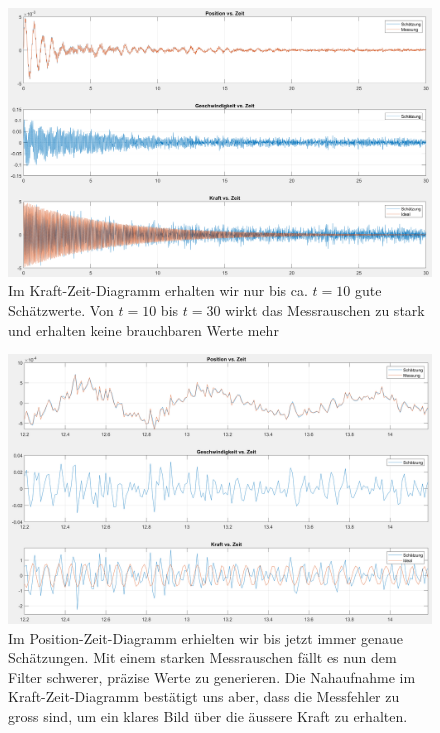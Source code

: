 \begin{figure}
	\begin{center}
		\includegraphics[width=\linewidth,keepaspectratio]{papers/erdbeben/Messrauschen_geaendert.PNG}
		\caption{Im Kraft-Zeit-Diagramm erhalten wir nur bis ca. $t = 10$ gute Schätzwerte. Von $t = 10$ bis $t = 30$ wirkt das Messrauschen zu stark und erhalten keine brauchbaren Werte mehr}
	 \label{erdbeben:fig:messrauschen-geaendert}
	\end{center}
\end{figure}

\begin{figure}
	\begin{center}
		\includegraphics[width=\linewidth,keepaspectratio]{papers/erdbeben/Messrauschen_geaendert_zoom.PNG}
		\caption{Im Position-Zeit-Diagramm erhielten wir bis jetzt immer genaue Schätzungen. Mit einem starken Messrauschen fällt es nun dem Filter schwerer, präzise Werte zu generieren. Die Nahaufnahme im Kraft-Zeit-Diagramm bestätigt uns aber, dass die Messfehler zu gross sind, um ein klares Bild über die äussere Kraft zu erhalten.}
		\label{erdbeben:fig:messrauschen-geaendert_zoom}
	\end{center}
\end{figure}

